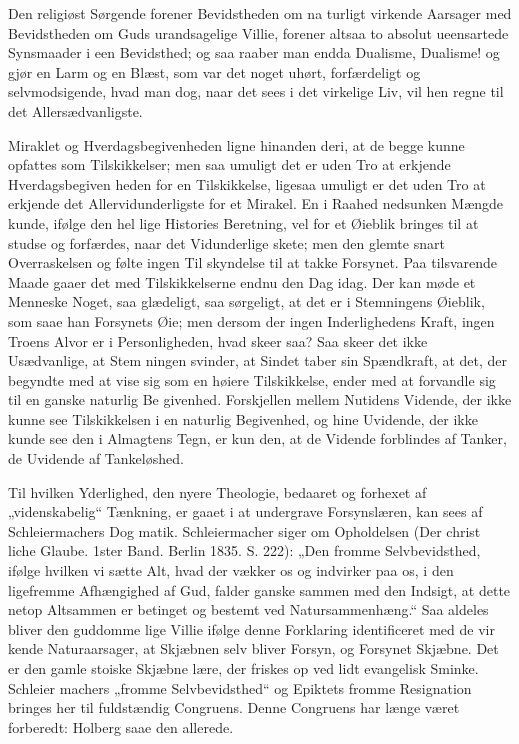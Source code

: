 \documentclass[12pt]{book}
\newcommand{\opage}[1]{\marginnote{\footnotesize\textit{[#1]}}}
\begin{document}
Den religiøst Sørgende forener Bevidstheden om na\-%
turligt virkende Aarsager med Bevidstheden om Guds
urandsagelige Villie, forener altsaa to absolut ueensartede
Synsmaader i een Bevidsthed; og saa raaber man endda
Dualisme, Dualisme! og gjør en Larm og en Blæst,
som var det noget uhørt, forfærdeligt og selvmodsigende,
hvad man dog, naar det sees i det virkelige Liv, vil hen\-%
regne til det Allersædvanligste.

Miraklet og Hverdagsbegivenheden ligne hinanden
deri, at de begge kunne opfattes som Tilskikkelser; men
saa umuligt det er uden Tro at erkjende Hverdagsbegiven\-%
heden for en Tilskikkelse, ligesaa umuligt er det uden
Tro at erkjende det Allervidunderligste for et Mirakel.
En i Raahed nedsunken Mængde kunde, ifølge den hel\-%
lige Histories Beretning, vel for et Øieblik bringes til at
studse og forfærdes, naar det Vidunderlige skete; men
den glemte snart Overraskelsen og følte ingen Til\-%
skyndelse til at takke Forsynet. Paa tilsvarende Maade
gaaer det med Tilskikkelserne endnu den Dag idag.
Der kan møde et Menneske Noget, saa glædeligt, saa
sørgeligt, at det er i Stemningens Øieblik, som saae han
Forsynets Øie; men dersom der ingen Inderlighedens
Kraft, ingen Troens Alvor er i Personligheden, hvad
skeer saa? Saa skeer det ikke Usædvanlige, at Stem\-%
ningen svinder, at Sindet taber sin Spændkraft, at det,
der begyndte med at vise sig som en høiere Tilskikkelse,
ender med at forvandle sig til en ganske naturlig Be\-%
givenhed. Forskjellen mellem Nutidens Vidende, der
ikke kunne see Tilskikkelsen i en naturlig Begivenhed,
og hine Uvidende, der ikke kunde see den i Almagtens
\opage{220}\setcounter{footnote}{0}%
Tegn, er kun den, at de Vidende forblindes af Tanker,
de Uvidende af Tankeløshed.

Til hvilken Yderlighed, den nyere Theologie, bedaaret
og forhexet af „videnskabelig“ Tænkning, er gaaet i at
undergrave Forsynslæren, kan sees af Schleiermachers Dog\-%
matik. Schleiermacher siger om Opholdelsen (Der christ\-%
liche Glaube. 1ster Band. Berlin 1835. S. 222): „Den
fromme Selvbevidsthed, ifølge hvilken vi sætte Alt, hvad
der vækker os og indvirker paa os, i den ligefremme
Afhængighed af Gud, falder ganske sammen med den
Indsigt, at dette netop Altsammen er betinget og bestemt
ved Natursammenhæng.“ Saa aldeles bliver den guddomme\-%
lige Villie ifølge denne Forklaring identificeret med de vir\-%
kende Naturaarsager, at Skjæbnen selv bliver Forsyn, og
Forsynet Skjæbne. Det er den gamle stoiske Skjæbne\-%
lære, der friskes op ved lidt evangelisk Sminke. Schleier\-%
machers „fromme Selvbevidsthed“ og Epiktets fromme
Resignation bringes her til fuldstændig Congruens. Denne
Congruens har længe været forberedt: Holberg saae den
allerede.
\end{document}
